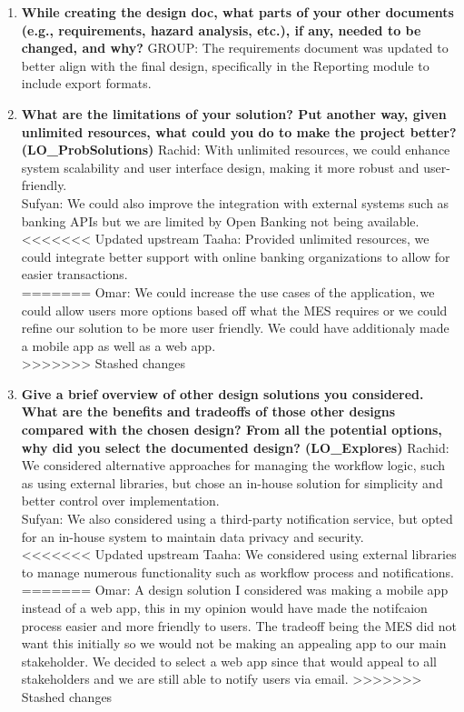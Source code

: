 \documentclass[12pt, titlepage]{article}
\begin{document}
\begin{enumerate}
  \item \textbf{While creating the design doc, what parts of your other documents (e.g., requirements, hazard analysis, etc.), if any, needed to be changed, and why?}  
  \newline
  GROUP: The requirements document was updated to better align with the final design, specifically in the Reporting module to include export formats.

  \item \textbf{What are the limitations of your solution? Put another way, given unlimited resources, what could you do to make the project better? (LO\_ProbSolutions)}  
  \newline
  Rachid: With unlimited resources, we could enhance system scalability and user interface design, making it more robust and user-friendly. \\
  Sufyan: We could also improve the integration with external systems such as banking APIs but we are limited by Open Banking not being available. \\
<<<<<<< Updated upstream
  Taaha: Provided unlimited resources, we could integrate better support with online banking organizations to allow for easier transactions. \\
=======
  Omar: We could increase the use cases of the application, we could allow users more options based off what the MES requires or we could refine our solution to be more user friendly. We could have additionaly made a mobile app as well as a web app. \\
>>>>>>> Stashed changes

  \item \textbf{Give a brief overview of other design solutions you considered. What are the benefits and tradeoffs of those other designs compared with the chosen design? From all the potential options, why did you select the documented design? (LO\_Explores)}  
  \newline
  Rachid: We considered alternative approaches for managing the workflow logic, such as using external libraries, but chose an in-house solution for simplicity and better control over implementation. \\
  Sufyan: We also considered using a third-party notification service, but opted for an in-house system to maintain data privacy and security. \\
<<<<<<< Updated upstream
  Taaha: We considered using external libraries to manage numerous functionality such as workflow process and notifications. \\
=======
  Omar: A design solution I considered was making a mobile app instead of a web app, this in my opinion would have made the notifcaion process easier and more friendly to users. The tradeoff being the MES did not want this initially so we would not be making an appealing app to our main stakeholder. We decided to select a web app since that would appeal to all stakeholders and we are still able to notify users via email. 
>>>>>>> Stashed changes
\end{enumerate}
\end{document}
